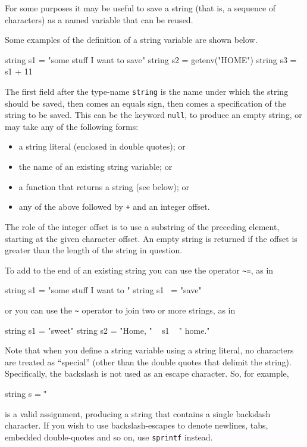 For some purposes it may be useful to save a string (that is, a
sequence of characters) as a named variable that can be reused.

Some examples of the definition of a string variable are shown
below.
%
\begin{code}
string s1 = "some stuff I want to save"
string s2 = getenv("HOME")
string s3 = s1 + 11
\end{code}
%
The first field after the type-name \texttt{string} is the name under
which the string should be saved, then comes an equals sign, then
comes a specification of the string to be saved. This can be the
keyword \texttt{null}, to produce an empty string, or may take any of
the following forms:

\begin{itemize}
\item a string literal (enclosed in double quotes); or
\item the name of an existing string variable; or
\item a function that returns a string (see below); or
\item any of the above followed by \texttt{+} and an integer offset.
\end{itemize}

The role of the integer offset is to use a substring of the preceding
element, starting at the given character offset.  An empty string is
returned if the offset is greater than the length of the string in
question.

To add to the end of an existing string you can use the operator
\verb|~=|, as in
%
\begin{code}
string s1 = "some stuff I want to "
string s1 ~= "save"
\end{code}
or you can use the \verb|~| operator to join two or more strings, as
in
\begin{code}
string s1 = "sweet"
string s2 = "Home, " ~ s1 ~ " home."
\end{code}

Note that when you define a string variable using a string literal, no
characters are treated as ``special'' (other than the double quotes
that delimit the string).  Specifically, the backslash is not used as
an escape character.  So, for example,
%
\begin{code}
string s = "\"
\end{code}
%
is a valid assignment, producing a string that contains a single
backslash character.  If you wish to use backslash-escapes to denote
newlines, tabs, embedded double-quotes and so on, use \texttt{sprintf}
instead.

